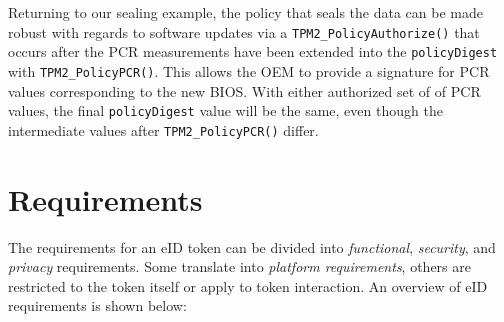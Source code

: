 \documentclass{sig-alternate-2013}
\begin{document}
Returning to our sealing example, the policy that seals the data can be made
robust with regards to software updates via a \texttt{TPM2\_PolicyAuthorize()}
that occurs after the PCR measurements have been extended into the
\texttt{policyDigest} with \texttt{TPM2\_PolicyPCR()}\footnotemark. This allows
the OEM to provide a signature for PCR values corresponding to the new BIOS\@.
With either authorized set of of PCR values, the final \texttt{policyDigest}
value will be the same, even though the intermediate values after
\texttt{TPM2\_PolicyPCR()} differ.


 
\section{Requirements}
\label{sec:requirements}

The requirements for an eID token can be divided into \textit{functional},
\textit{security}, and \textit{privacy} requirements. Some translate into
\textit{platform requirements}, others are restricted to the token itself or
apply to token interaction. An overview of
eID requirements is shown below:
\end{document}
